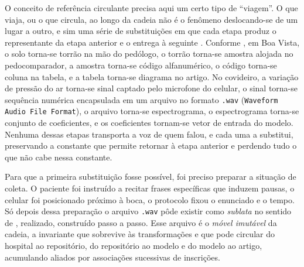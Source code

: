 O conceito de referência circulante precisa aqui um certo tipo de \enquote{viagem}. O que viaja, ou o que circula, ao longo da cadeia não é o fenômeno deslocando-se de um lugar a outro, e sim uma série de substituições em que cada etapa produz o representante da etapa anterior e o entrega à seguinte \parencite{Latour2017Esperanca}. Conforme \textcite{Latour2017Esperanca}, em Boa Vista, o solo torna-se torrão na mão do pedólogo, o torrão torna-se amostra alojada no pedocomparador, a amostra torna-se código alfanumérico, o código torna-se coluna na tabela, e a tabela torna-se diagrama no artigo. No covideiro, a variação de pressão do ar torna-se sinal captado pelo microfone do celular, o sinal torna-se sequência numérica encapsulada em um arquivo no formato \texttt{.wav} (\texttt{Waveform Audio File Format}), o arquivo torna-se espectrograma, o espectrograma torna-se conjunto de coeficientes, e os coeficientes tornam-se vetor de entrada do modelo. Nenhuma dessas etapas transporta a voz de quem falou, e cada uma a substitui, preservando a constante que permite retornar à etapa anterior e perdendo tudo o que não cabe nessa constante.

Para que a primeira substituição fosse possível, foi preciso preparar a situação de coleta. O paciente foi instruído a recitar frases específicas que induzem pausas, o celular foi posicionado próximo à boca, o protocolo fixou o enunciado e o tempo. Só depois dessa preparação o arquivo \texttt{.wav} pôde existir como \textit{sublata} no sentido de \textcite{Latour2017Esperanca}, realizado, construído passo a passo. Esse arquivo é o \textit{móvel imutável} da cadeia, a invariante que sobrevive às transformações e que pode circular do hospital ao repositório, do repositório ao modelo e do modelo ao artigo, acumulando aliados por associações sucessivas de inscrições.

